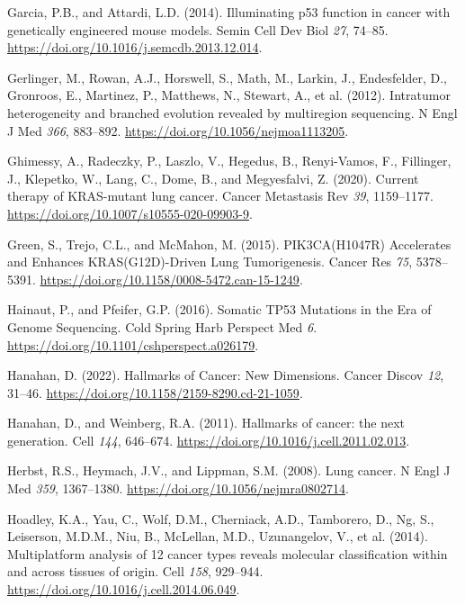 \begin{CSLReferences}{0}{0}
\leavevmode{}%
Garcia, P.B., and Attardi, L.D. (2014). Illuminating p53 function in cancer with genetically engineered mouse models. Semin Cell Dev Biol \emph{27}, 74--85. \url{https://doi.org/10.1016/j.semcdb.2013.12.014}.

\leavevmode{}%
Gerlinger, M., Rowan, A.J., Horswell, S., Math, M., Larkin, J., Endesfelder, D., Gronroos, E., Martinez, P., Matthews, N., Stewart, A., et al. (2012). Intratumor heterogeneity and branched evolution revealed by multiregion sequencing. N Engl J Med \emph{366}, 883--892. \url{https://doi.org/10.1056/nejmoa1113205}.

\leavevmode{}%
Ghimessy, A., Radeczky, P., Laszlo, V., Hegedus, B., Renyi-Vamos, F., Fillinger, J., Klepetko, W., Lang, C., Dome, B., and Megyesfalvi, Z. (2020). Current therapy of KRAS-mutant lung cancer. Cancer Metastasis Rev \emph{39}, 1159--1177. \url{https://doi.org/10.1007/s10555-020-09903-9}.

\leavevmode{}%
Green, S., Trejo, C.L., and McMahon, M. (2015). PIK3CA(H1047R) Accelerates and Enhances KRAS(G12D)-Driven Lung Tumorigenesis. Cancer Res \emph{75}, 5378--5391. \url{https://doi.org/10.1158/0008-5472.can-15-1249}.

\leavevmode{}%
Hainaut, P., and Pfeifer, G.P. (2016). Somatic TP53 Mutations in the Era of Genome Sequencing. Cold Spring Harb Perspect Med \emph{6}. \url{https://doi.org/10.1101/cshperspect.a026179}.

\leavevmode{}%
Hanahan, D. (2022). Hallmarks of Cancer: New Dimensions. Cancer Discov \emph{12}, 31--46. \url{https://doi.org/10.1158/2159-8290.cd-21-1059}.

\leavevmode{}%
Hanahan, D., and Weinberg, R.A. (2011). Hallmarks of cancer: the next generation. Cell \emph{144}, 646--674. \url{https://doi.org/10.1016/j.cell.2011.02.013}.

\leavevmode{}%
Herbst, R.S., Heymach, J.V., and Lippman, S.M. (2008). Lung cancer. N Engl J Med \emph{359}, 1367--1380. \url{https://doi.org/10.1056/nejmra0802714}.

\leavevmode{}%
Hoadley, K.A., Yau, C., Wolf, D.M., Cherniack, A.D., Tamborero, D., Ng, S., Leiserson, M.D.M., Niu, B., McLellan, M.D., Uzunangelov, V., et al. (2014). Multiplatform analysis of 12 cancer types reveals molecular classification within and across tissues of origin. Cell \emph{158}, 929--944. \url{https://doi.org/10.1016/j.cell.2014.06.049}.


\end{CSLReferences}
